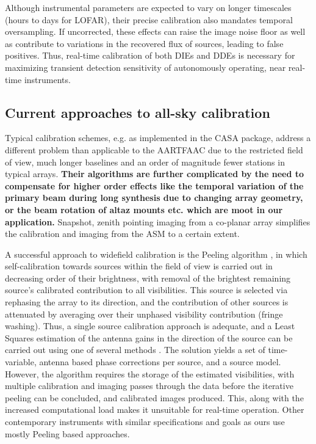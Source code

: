 \documentclass{aa}
\begin{document}
Although  instrumental parameters  are  expected to  vary  on longer  timescales
(hours  to days  for LOFAR),  their precise  calibration also  mandates temporal
oversampling.  If uncorrected, these effects  can raise the image noise floor as
well as  contribute to variations in  the recovered flux of  sources, leading to
false positives.  Thus, real-time calibration of both DIEs and DDEs is necessary
for maximizing  transient detection sensitivity of  autonomously operating, near
real-time instruments.

\subsection{Current approaches to all-sky calibration}

Typical calibration schemes, e.g. as  implemented in the CASA package, address a
different problem than applicable to the AARTFAAC due to the restricted field of
view, much longer baselines and an  order of magnitude fewer stations in typical
arrays.  \textbf{Their algorithms are further  complicated by the need to compensate for
higher order effects like the temporal variation of the primary beam during long
synthesis due to  changing array geometry, or the beam  rotation of altaz mounts
etc. which are moot in our application.} Snapshot, zenith pointing imaging from a
co-planar array simplifies the calibration and imaging from the ASM to a certain
extent.

A  successful  approach  to  widefield  calibration  is  the  Peeling  algorithm
\citep{noordam2004peel,vdTol2007selfcallofar}, in which self-calibration towards
sources within  the field of  view is carried  out in decreasing order  of their
brightness,  with  removal  of   the  brightest  remaining  source's  calibrated
contribution  to all  visibilities. This  source is  selected via  rephasing the
array to its  direction, and the contribution of other  sources is attenuated by
averaging over their unphased  visibility contribution (fringe washing). Thus, a
single source calibration  approach is adequate, and a  Least Squares estimation
of the antenna gains in the direction of the source can be carried out using one
of  several methods  \citep{boonstra2003gain}.   The solution  yields  a set  of
time-variable, antenna based  phase corrections per source, and  a source model.
However, the algorithm requires the  storage of the estimated visibilities, with
multiple calibration  and imaging passes  through the data before  the iterative
peeling can be  concluded, and calibrated images produced.  This, along with the
increased computational load makes it unsuitable for real-time operation.  Other
contemporary  instruments with  similar  specifications and  goals  as ours  use
mostly Peeling  based approaches. 
\end{document}
